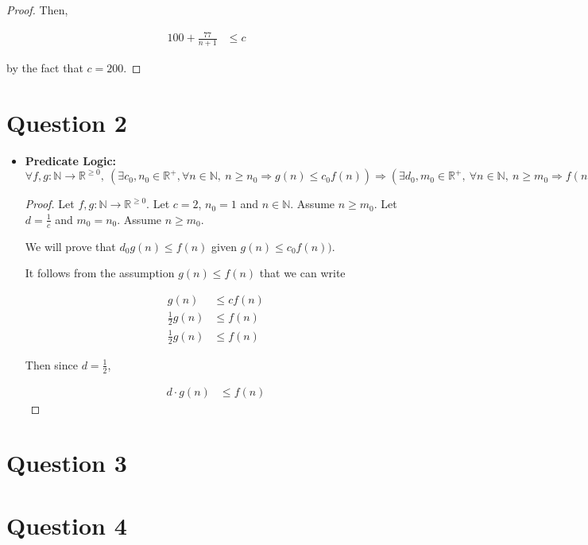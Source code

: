 \documentclass[12pt]{article}
\begin{document}
\begin{enumerate}[a.]
\begin{proof}
        \bigskip

        Then,

        \begin{align}
            100 + \frac{77}{n+1} &\leq c
        \end{align}

        by the fact that $c = 200$.
    \end{proof}

\end{enumerate}

\section*{Question 2}
\begin{itemize}
    \item

    \textbf{Predicate Logic:} $\forall f,g:\mathbb{N} \to \mathbb{R}^{\geq 0},\:
    (\exists c_0,n_0 \in \mathbb{R}^{+}, \forall n \in \mathbb{N}, \:n \geq
    n_0 \Rightarrow g(n) \leq c_0f(n)) \Rightarrow (\exists d_0,m_0 \in
    \mathbb{R}^{+},\:\forall n \in \mathbb{N},\:n \geq m_0 \Rightarrow f(n) \geq d g(n))$

    \bigskip

    \begin{proof}

    Let $f,g:\mathbb{N} \to \mathbb{R}^{\geq 0}$. Let $c = 2$, $n_0 = 1$ and
    $n \in \mathbb{N}$. Assume $n \geq m_0$. Let $d = \frac{1}{c}$ and $m_0 = n_0$.
    Assume $n \geq m_0$.

    \bigskip

    We will prove that $d_0g(n) \leq f(n)$ given $g(n) \leq c_0f(n))$.

    \bigskip

    It follows from the assumption $g(n) \leq f(n)$ that we can write

    \setcounter{equation}{0}
    \begin{align}
        g(n) &\leq cf(n)\\
        \frac{1}{2} g(n) &\leq f(n)\\
        \frac{1}{2} g(n) &\leq f(n)
    \end{align}

    \bigskip

    Then since $d = \frac{1}{2}$,

    \begin{align}
        d \cdot g(n) &\leq f(n)
    \end{align}
    \end{proof}
\end{itemize}

\section*{Question 3}

\section*{Question 4}
\end{document}
